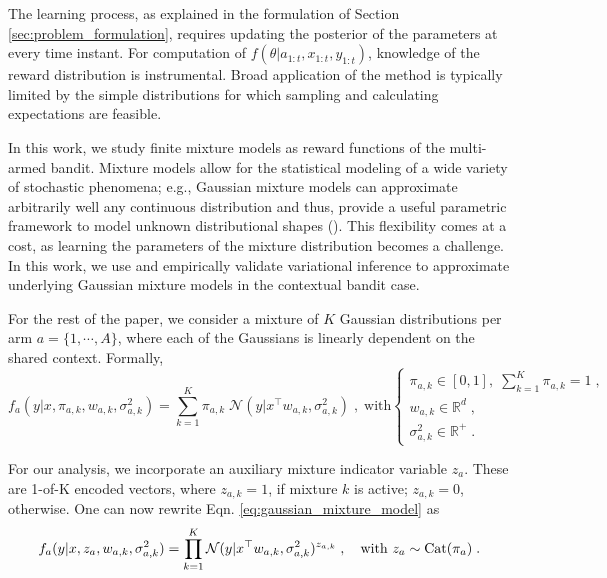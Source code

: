 \documentclass{article}
\def \Real{{\mathbb R}}
\newcommand{\N}{\mathcal{N}}
\newcommand{\Cat}{{\rm Cat}}
\begin{document}
The learning process, as explained in the formulation of Section \ref{sec:problem_formulation}, requires updating the posterior of the parameters at every time instant. For computation of $f(\theta|a_{1:t}, x_{1:t}, y_{1:t})$, knowledge of the reward distribution is instrumental. Broad application of the method is typically limited by the simple distributions for which sampling and calculating expectations are feasible.

In this work, we study finite mixture models as reward functions of the multi-armed bandit. Mixture models allow for the statistical modeling of a wide variety of stochastic phenomena; e.g., Gaussian mixture models can approximate arbitrarily well any continuous distribution and thus, provide a useful parametric framework to model unknown distributional shapes (\cite{b-McLachlan2004}). This flexibility comes at a cost, as learning the parameters of the mixture distribution becomes a challenge. In this work, we use and empirically validate variational inference to approximate underlying Gaussian mixture models in the contextual bandit case.

For the rest of the paper, we consider a mixture of $K$ Gaussian distributions per arm $a=\{1, \cdots, A\}$, where each of the Gaussians is linearly dependent on the shared context. Formally,
\begin{equation}
f_a(y|x,\pi_{a,k}, w_{a,k}, \sigma_{a,k}^2) =\sum_{k=1}^K \pi_{a,k} \; \N(y|x^\top w_{a,k}, \sigma_{a,k}^2)  \;,
\; \text{with} \begin{cases}
\pi_{a,k}\in [0,1], \; \sum_{k=1}^K \pi_{a,k} = 1 \;,  \\
w_{a,k}\in \Real^{d} \;, \\
\sigma_{a,k}^2\in \Real^+ \;.
\end{cases}
\label{eq:gaussian_mixture_model}
\end{equation}

For our analysis, we incorporate an auxiliary mixture indicator variable $z_a$. These are 1-of-K encoded vectors, where $z_{a,k}=1$, if mixture $k$ is active; $z_{a,k}=0$, otherwise. One can now rewrite Eqn. \ref{eq:gaussian_mixture_model} as
\begin{equation}
f_a(y|x,z_{a},w_{a,k}, \sigma_{a,k}^2) =\prod_{k=1}^K \N(y|x^\top w_{a,k}, \sigma_{a,k}^2)^{z_{a,k}} \;, \quad \text{with } z_{a} \sim \Cat(\pi_{a}) \; .
\label{eq:gaussian_mixture_model_z}
\end{equation}
\end{document}

